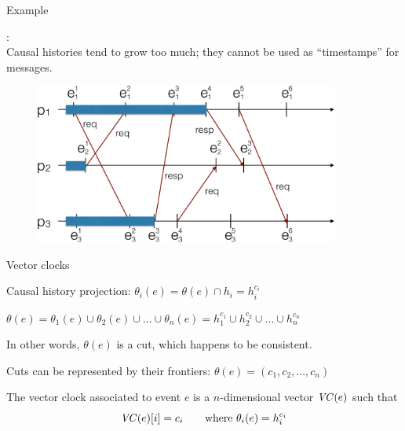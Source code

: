 \begin{frame}{Example}

: \\	
Causal histories tend to grow too much; they cannot be used as ``timestamps'' for messages.

\begin{figure} 
\includegraphics[width=10cm]{figs/03/diagram6}
\end{figure}
\end{frame}

\begin{frame}{Vector clocks}
\BI
\item Causal history projection: $\theta_i(e) = \theta(e) \cap h_i = h_i^{c_i}$
\item $\theta(e) = \theta_1(e) \cup \theta_2(e) \cup \ldots \cup \theta_n(e) = h_1^{c_1} \cup h_2^{c_2} \cup \ldots \cup h_n^{c_n}$
\item In other words, $\theta(e)$ is a cut, which happens to be consistent.
\item Cuts can be represented by their frontiers: $\theta(e) = (c_1, c_2, \ldots, c_n)$
\EI

\begin{definition}
The \alert{vector clock} associated to event $e$ is a $n$-dimensional vector $\mathit{VC}(e)$ such that
\[
  \mathit{VC}(e)[i] = c_i \qquad \mbox{where $\theta_i(e) = h_i^{c_i}$}
\]
\end{definition}


\end{frame}

